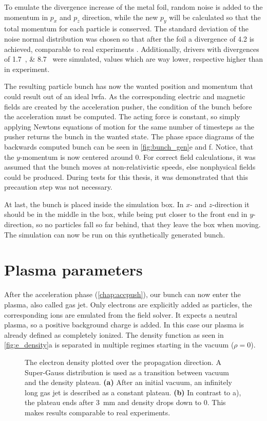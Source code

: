 \documentclass[bachelor_thesis]{subfiles}
\begin{document}
To emulate the divergence increase of the metal foil, random noise is added to the momentum in $p_x$ and $p_z$ direction, while the new $p_y$ will be calculated so that the total momentum for each particle is conserved.
The standard deviation of the noise normal distribution was chosen so that after the foil a divergence of \qty{4.2}{\mrad} is achieved, comparable to real experiments \cite{Schoebel2022}.
Additionally, drivers with divergences of \qtylist{1.7; 8.7}{\mrad} were simulated, values which are way lower, respective higher than in experiment.

The resulting particle bunch has now the wanted position and momentum that could result out of an ideal \gls{lwfa}. As the corresponding electric and magnetic fields are created by the acceleration pusher,
the condition of the bunch before the acceleration must be computed. The acting force is constant, so simply applying Newtons equations of motion for the same number of timesteps as the pusher returns the bunch in the wanted state.
The phase space diagrams of the backwards computed bunch can be seen in \autoref {fig:bunch_gen}e and f. Notice, that the $y$-momentum is now centered around \num{0}. For correct field calculations, it was assumed that the bunch moves at non-relativistic speeds,
else nonphysical fields could be produced. During tests for this thesis, it was demonstrated that this precaution step was not necessary.

At last, the bunch is placed inside the simulation box. In $x$- and $z$-direction it should be in the middle in the box, while being put closer to the front end in $y$-direction, so no particles fall so far behind, that they leave the box when moving.
The simulation can now be run on this synthetically generated bunch.

\section{Plasma parameters}\label{chap:plasma}
After the acceleration phase (\autoref{chap:accpush}), our bunch can now enter the plasma, also called gas jet.
Only electrons are explicitly added as particles, the corresponding ions are emulated from the field solver. It expects a neutral plasma, so a positive background charge is added. 
In this case our plasma is already defined as completely ionized. The density function as seen in \autoref{fig:e_density}a is separated in multiple regimes starting in the vacuum ($\rho=0$). 

\begin{figure}
	\centering
	
	\caption{The electron density plotted over the propagation direction. A Super-Gauss distribution is used as a transition between vacuum and the density plateau.
	\textbf{(a)} After an initial vacuum, an infinitely long gas jet is described as a constant plateau.
	\textbf{(b)} In contrast to a), the plateau ends after \qty{3}{\mm} and density drops down to 0. This makes results comparable to real experiments.}
	\label{fig:e_density}
\end{figure}
\end{document}
